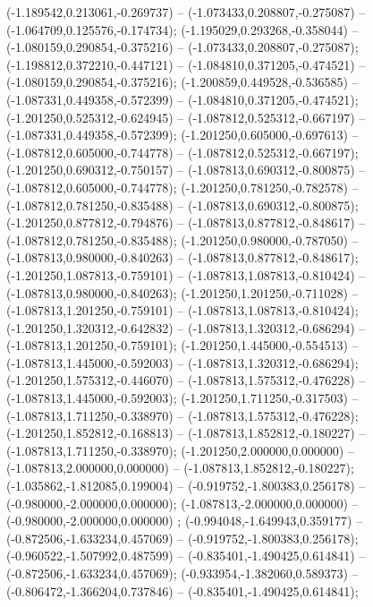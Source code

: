  (-1.189542,0.213061,-0.269737) -- (-1.073433,0.208807,-0.275087) -- (-1.064709,0.125576,-0.174734);
 (-1.195029,0.293268,-0.358044) -- (-1.080159,0.290854,-0.375216) -- (-1.073433,0.208807,-0.275087);
 (-1.198812,0.372210,-0.447121) -- (-1.084810,0.371205,-0.474521) -- (-1.080159,0.290854,-0.375216);
 (-1.200859,0.449528,-0.536585) -- (-1.087331,0.449358,-0.572399) -- (-1.084810,0.371205,-0.474521);
 (-1.201250,0.525312,-0.624945) -- (-1.087812,0.525312,-0.667197) -- (-1.087331,0.449358,-0.572399);
 (-1.201250,0.605000,-0.697613) -- (-1.087812,0.605000,-0.744778) -- (-1.087812,0.525312,-0.667197);
 (-1.201250,0.690312,-0.750157) -- (-1.087813,0.690312,-0.800875) -- (-1.087812,0.605000,-0.744778);
 (-1.201250,0.781250,-0.782578) -- (-1.087812,0.781250,-0.835488) -- (-1.087813,0.690312,-0.800875);
 (-1.201250,0.877812,-0.794876) -- (-1.087813,0.877812,-0.848617) -- (-1.087812,0.781250,-0.835488);
 (-1.201250,0.980000,-0.787050) -- (-1.087813,0.980000,-0.840263) -- (-1.087813,0.877812,-0.848617);
 (-1.201250,1.087813,-0.759101) -- (-1.087813,1.087813,-0.810424) -- (-1.087813,0.980000,-0.840263);
 (-1.201250,1.201250,-0.711028) -- (-1.087813,1.201250,-0.759101) -- (-1.087813,1.087813,-0.810424);
 (-1.201250,1.320312,-0.642832) -- (-1.087813,1.320312,-0.686294) -- (-1.087813,1.201250,-0.759101);
 (-1.201250,1.445000,-0.554513) -- (-1.087813,1.445000,-0.592003) -- (-1.087813,1.320312,-0.686294);
 (-1.201250,1.575312,-0.446070) -- (-1.087813,1.575312,-0.476228) -- (-1.087813,1.445000,-0.592003);
 (-1.201250,1.711250,-0.317503) -- (-1.087813,1.711250,-0.338970) -- (-1.087813,1.575312,-0.476228);
 (-1.201250,1.852812,-0.168813) -- (-1.087813,1.852812,-0.180227) -- (-1.087813,1.711250,-0.338970);
 (-1.201250,2.000000,0.000000) -- (-1.087813,2.000000,0.000000) -- (-1.087813,1.852812,-0.180227);
 (-1.035862,-1.812085,0.199004) -- (-0.919752,-1.800383,0.256178) -- (-0.980000,-2.000000,0.000000);
 (-1.087813,-2.000000,0.000000) -- (-0.980000,-2.000000,0.000000) ;
 (-0.994048,-1.649943,0.359177) -- (-0.872506,-1.633234,0.457069) -- (-0.919752,-1.800383,0.256178);
 (-0.960522,-1.507992,0.487599) -- (-0.835401,-1.490425,0.614841) -- (-0.872506,-1.633234,0.457069);
 (-0.933954,-1.382060,0.589373) -- (-0.806472,-1.366204,0.737846) -- (-0.835401,-1.490425,0.614841);
